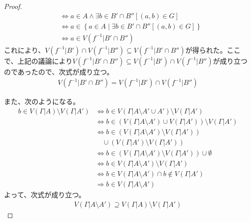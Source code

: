 \documentclass[a4paper]{jsarticle}
\begin{document}
\begin{proof}
\begin{align*}
&\Leftrightarrow a \in A \land \exists b \in B' \cap B''\left[ (a,b) \in G \right]\\
&\Leftrightarrow a \in \left\{ a \in A \middle| \exists b \in B' \cap B''\left[ (a,b) \in G \right] \right\}\\
&\Leftrightarrow a \in V\left( f^{- 1}|B' \cap B'' \right)
\end{align*}
これにより、$V\left( f^{- 1}|B' \right) \cap V\left( f^{- 1}|B'' \right) \subseteq V\left( f^{- 1}|B' \cap B'' \right)$が得られた。ここで、上記の議論により$V\left( f^{- 1}|B' \cap B'' \right) \subseteq V\left( f^{- 1}|B' \right) \cap V\left( f^{- 1}|B'' \right)$が成り立つのであったので、次式が成り立つ。
\begin{align*}
V\left( f^{- 1}|B' \cap B'' \right) = V\left( f^{- 1}|B' \right) \cap V\left( f^{- 1}|B'' \right)
\end{align*}\par
また、次のようになる。
\begin{align*}
b \in V\left( \varGamma|A \right) \setminus V\left( \varGamma|A' \right) &\Leftrightarrow b \in V\left( \varGamma|A \setminus A' \cup A' \right) \setminus V\left( \varGamma|A' \right)\\
&\Leftrightarrow b \in \left( V\left( \varGamma|A \setminus A' \right) \cup V\left( \varGamma|A' \right) \right) \setminus V\left( \varGamma|A' \right)\\
&\Leftrightarrow b \in \left( V\left( \varGamma|A \setminus A' \right) \setminus V\left( \varGamma|A' \right) \right) \\
&\quad \cup \left( V\left( \varGamma|A' \right) \setminus V\left( \varGamma|A' \right) \right)\\
&\Leftrightarrow b \in \left( V\left( \varGamma|A \setminus A' \right) \setminus V\left( \varGamma|A' \right) \right) \cup \emptyset\\
&\Leftrightarrow b \in V\left( \varGamma|A \setminus A' \right) \setminus V\left( \varGamma|A' \right)\\
&\Leftrightarrow b \in V\left( \varGamma|A \setminus A' \right) \cap b \notin V\left( \varGamma|A' \right)\\
&\Rightarrow b \in V\left( \varGamma|A \setminus A' \right)
\end{align*}
よって、次式が成り立つ。
\begin{align*}
V\left( \varGamma|A \setminus A' \right) \supseteq V\left( \varGamma|A \right) \setminus V\left( \varGamma|A' \right)
\end{align*}\par

\end{proof}
\end{document}
